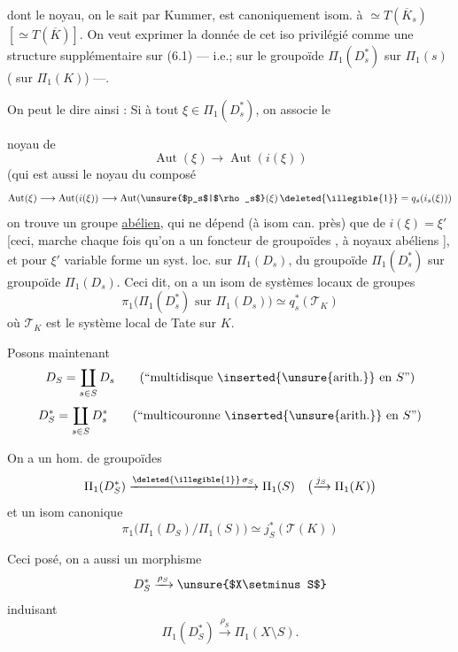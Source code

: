 dont le noyau, on le sait par Kummer, est canoniquement isom. à
$\simeq T(\overline K_s)$ $[\simeq T(\overline K)]$.
On veut exprimer la donnée de cet iso privilégié comme une structure
supplémentaire sur (6.1) --- 
i.e.; sur le groupoïde $\Pi_1(D_s^*)$ sur $\Pi_1(s)$
( sur $\Pi_1(K)$) ---.

On peut le dire ainsi :  Si à tout
\deleted{\unsure{$\xi$}} $\xi\in\Pi_1(D_s^*)$, on associe le



noyau de
\[
\operatorname{Aut}(\xi)\longrightarrow\operatorname{Aut}(i(\xi))
\]
(qui est aussi le noyau du composé
\[
\operatorname{Aut}(\xi)\longrightarrow\operatorname{Aut}(i(\xi))
\longrightarrow
\operatorname{Aut}(\text{\unsure{$p_s$|$\rho_s$}}(\xi)\,
\text{\deleted{\illegible{1}}}=q_s(i_s(\xi)))
\]
on trouve un groupe \uline{abélien}, qui ne dépend (à isom can. près)
que  de $i(\xi)=\xi'$
[ceci, 
marche chaque fois qu'on a
un foncteur
 de groupoïdes ,
à noyaux abéliens ],
et pour $\xi'$ variable forme un syst. loc. sur $\Pi_1(D_s)$,
du groupoïde $\Pi_1(D_s^*)$ sur  groupoïde
$\Pi_1(D_s)$. Ceci dit, on a un isom de systèmes locaux de groupes
\[
\pi_1\bigl(\Pi_1(D_s^*)\text{ sur }\Pi_1(D_s)\bigr)
\simeq q_s^*(\mathcal T_K)
\]
où $\mathcal T_K$ est le système local de Tate sur $K$.



Posons maintenant
\[
D_S=\coprod_{s\in S}D_s
\qquad\text{(``multidisque \inserted{\unsure{arith.}} en $S$'')}
\]
\[
D_S^*=\coprod_{s\in S}D_s^*
\qquad\text{(``multicouronne \inserted{\unsure{arith.}} en $S$'')}
\]

On a un hom. de groupoïdes
\[
\Pi_1(D_S^*)
\xrightarrow{\text{\deleted{\illegible{1}}}\,\sigma_S}
\Pi_1(S)
\quad\bigl(\xrightarrow{j_S}\Pi_1(K)\bigr)
\]
et un isom canonique
\[
\pi_1\bigl(\Pi_1(D_S)/\Pi_1(S)\bigr)
\simeq
j_S^*(\mathcal T(K))
\]

Ceci posé, on a aussi un morphisme
\[
D_S^*\xrightarrow{\rho_S}\text{\unsure{$X\setminus S$}}
\]
induisant
\[
\Pi_1(D_S^*)\xrightarrow{\rho_S}\Pi_1(X\setminus S).
\]

